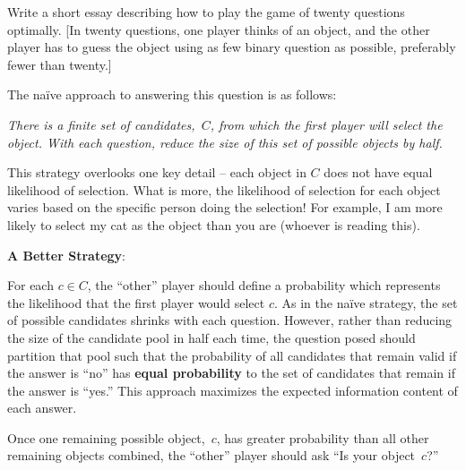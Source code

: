 \newpage
\begin{problem}{5}{24}
  Write a short essay describing how to play the game of twenty questions optimally.  \textnormal{[In twenty questions, one player thinks of an object, and the other player has to guess the object using as few binary question as possible, preferably fewer than twenty.]}
\end{problem}

The na\"ive approach to answering this question is as follows:

\begin{addmargin}[0.5in]{0.5in}
  \textit{There is a finite set of candidates,~$C$, from which the first player will select the object.  With each question, reduce the size of this set of possible objects by half.}
\end{addmargin}

\noindent
This strategy overlooks one key detail -- each object in $C$ does not have equal likelihood of selection.  What is more, the likelihood of selection for each object varies based on the specific person doing the selection!  For example, I am more likely to select my cat as the object than you are (whoever is reading this).

\noindent
\textbf{A Better Strategy}:

For each $c \in C$, the ``other'' player should define a probability which represents the likelihood that the first player would select $c$. As in the na\"ive strategy, the set of possible candidates shrinks with each question.  However, rather than reducing the size of the candidate pool in half each time, the question posed should partition that pool such that the probability of all candidates that remain valid if the answer is ``no'' has \textbf{equal probability} to the set of candidates that remain if the answer is ``yes.''  This approach maximizes the expected information content of each answer.

Once one remaining possible object,~$c$, has greater probability than all other remaining objects combined, the ``other'' player should ask ``Is your object~$c$?''
